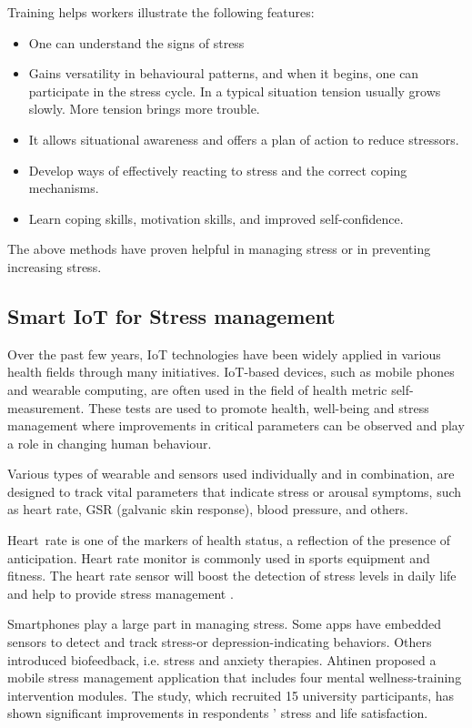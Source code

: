 Training helps workers illustrate the following features:
\begin{itemize}
    \item One can understand the signs of stress 
    \item Gains versatility in behavioural patterns, and when it begins, one can participate in the stress cycle. In a typical situation tension usually grows slowly. More tension brings more trouble. 
    \item It allows situational awareness and offers a plan of action to reduce stressors.
    \item Develop ways of effectively reacting to stress and the correct coping mechanisms. 
    \item Learn coping skills, motivation skills, and improved self-confidence.
\end{itemize}

The above methods have proven helpful in managing stress or in preventing increasing stress. \citep{Michie2002CausesWork.}

\subsection{Smart \acs{IoT} for Stress management}
Over the past few years, \acs{IoT} technologies have been widely applied in various health fields through many initiatives. \acs{IoT}-based devices, such as mobile phones and wearable computing, are often used in the field of health metric self-measurement.  These tests are used to promote health, well-being and stress management where improvements in critical parameters can be observed and play a role in changing human behaviour. 

Various types of wearable and sensors used individually and in combination, are designed to track vital parameters that indicate stress or arousal symptoms, such as heart rate, GSR (galvanic skin response), blood pressure, and others. 

Heart rate is one of the markers of health status, a reflection of the presence of anticipation.  Heart rate monitor is commonly used in sports equipment\citep{Fu2015SystemDevice} and fitness.  The heart rate sensor will boost the detection of stress levels in daily life and help to provide stress management\cite[p.330-339]{Millings2015CanTechnology} \cite[p.361-371]{Parnandi2017PhysiologicalGames}.

Smartphones play a large part in managing stress.  Some apps have embedded sensors to detect and track stress-or depression-indicating behaviors\cite[p.175]{Saeb2015MobileStudy}. Others introduced biofeedback, i.e. stress and anxiety therapies\cite[p.1274-1286]{AlOsman2016UbiquitousManagement}\citep{Zafar2017PlayingBiofeedback}. Ahtinen proposed a mobile stress management application that includes four mental wellness-training intervention modules\cite[p.11]{Ahtinen2013MobileStudy}. The study, which recruited 15 university participants, has shown significant improvements in respondents ' stress and life satisfaction.

